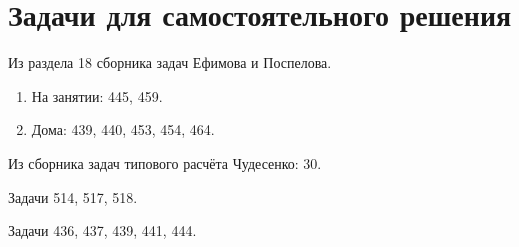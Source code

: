 \section*{Задачи для самостоятельного решения}

Из раздела 18 сборника задач Ефимова и Поспелова.
\begin{enumerate}
    \item На занятии: 445, 459.
    \item Дома: 439, 440, 453, 454, 464.
\end{enumerate}

Из сборника задач типового расчёта Чудесенко: 30.

Задачи 514, 517, 518.

Задачи 436, 437, 439, 441, 444.
